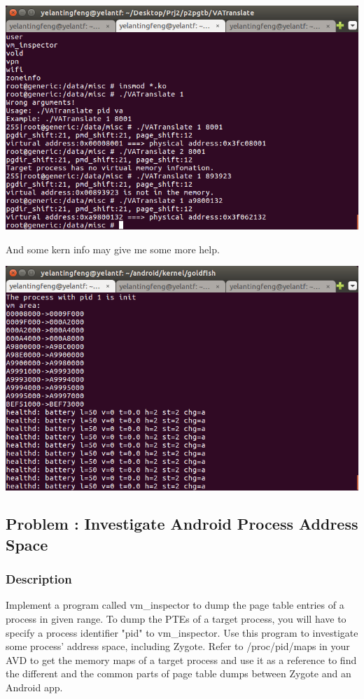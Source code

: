 \documentclass[12pt,a4paper,UTF8]{article}
\theoremstyle{definition}
\numberwithin{equation}{section}
\numberwithin{figure}{section}
\begin{document}
\begin{center}
\includegraphics[scale=0.65]{vatranslate.png}
\end{center}
And some kern info may give me some more help.
\begin{center}
\includegraphics[scale=0.65]{vatranslate2.png}
\end{center}
\newpage

\subsection{Problem \uppercase\expandafter{} : Investigate Android Process Address Space}
\subsubsection{Description}
Implement a program called {\color{cyan}\bashfont vm\_inspector} to dump the page table entries of a process in given range. To dump the PTEs of a target process, you will have to specify a process identifier "pid" to {\color{cyan}\bashfont vm\_inspector}. Use this program to investigate some process' address space, including Zygote. Refer to {\color{blue} /proc/pid/maps} in your AVD to get the memory maps of a target process and use it as a
reference to find the different and the common parts of page table dumps between Zygote
and an Android app.
\end{document}

